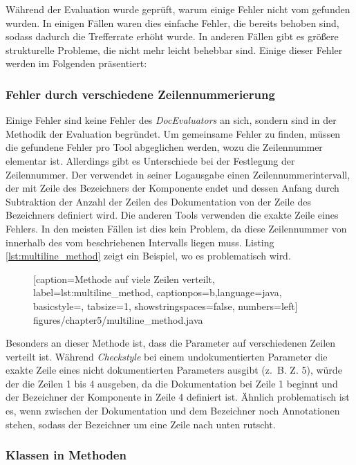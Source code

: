 Während der Evaluation wurde geprüft, warum einige Fehler nicht vom \doceval gefunden wurden. In einigen Fällen waren dies einfache Fehler, die bereits behoben sind, sodass dadurch die Trefferrate erhöht wurde. In anderen Fällen gibt es größere strukturelle Probleme, die nicht mehr leicht behebbar sind. Einige dieser Fehler werden im Folgenden präsentiert: 
\subsubsection{Fehler durch verschiedene Zeilennummerierung}

Einige Fehler sind keine Fehler des \textit{DocEvaluators} an sich, sondern sind in der Methodik der Evaluation begründet. Um gemeinsame Fehler zu finden, müssen die gefundene Fehler pro Tool abgeglichen werden, wozu die Zeilennummer elementar ist. Allerdings gibt es Unterschiede bei der Festlegung der Zeilennummer. Der \doceval verwendet in seiner Logausgabe einen Zeilennummerintervall, der mit Zeile des Bezeichners der Komponente endet und dessen Anfang durch Subtraktion der Anzahl der Zeilen des Dokumentation von der Zeile des Bezeichners definiert wird. Die anderen Tools verwenden die exakte Zeile eines Fehlers. In den meisten Fällen ist dies kein Problem, da diese Zeilennummer von \checkpmd innerhalb des vom \doceval beschriebenen Intervalls liegen muss. Listing \ref{lst:multiline_method} zeigt ein Beispiel, wo es problematisch wird.

		\begin{figure}[ht!]
			
			[caption={Methode auf viele Zeilen verteilt},
			label={lst:multiline_method},
			captionpos=b,language=java, basicstyle=\footnotesize, tabsize=1, showstringspaces=false,  numbers=left]
			{figures/chapter5/multiline_method.java}
		\end{figure}
Besonders an dieser Methode ist, dass die Parameter auf verschiedenen Zeilen verteilt ist. Während \textit{Checkstyle} bei einem undokumentierten Parameter die exakte Zeile eines nicht dokumentierten Parameters ausgibt (z.~B. Z. 5), würde der \doceval die Zeilen 1 bis 4 ausgeben, da die Dokumentation bei Zeile 1 beginnt und der Bezeichner der Komponente in Zeile 4 definiert ist. Ähnlich problematisch ist es, wenn zwischen der Dokumentation und dem Bezeichner noch Annotationen stehen, sodass der Bezeichner um eine Zeile nach unten rutscht.  

\subsubsection{Klassen in Methoden}

